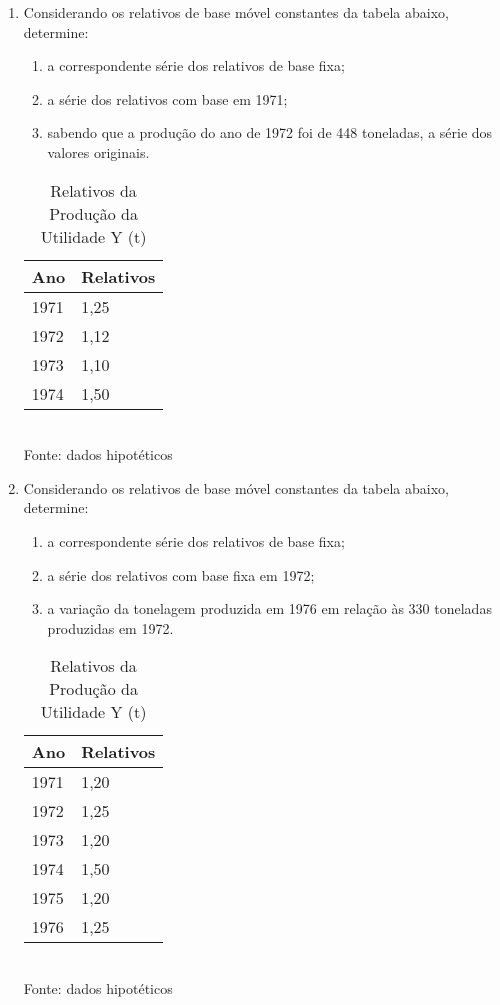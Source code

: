 \begin{enumerate}[resume]
\item Considerando os relativos de base móvel constantes da tabela abaixo, determine:
	\begin{enumerate}
	\item a correspondente série dos relativos de base fixa;
	\item a série dos relativos com base em 1971;
	\item sabendo que a produção do ano de 1972 foi de 448 toneladas, a série dos valores originais.
	\end{enumerate}
	\begin{table}[!htb]
	\centering
	\caption{Relativos da Produção da Utilidade Y (t)}
	\begin{tabular}{ll}
	Ano & Relativos \\
	\hline 
	1971 & 1,25 \\
	1972 & 1,12  \\
	1973 & 1,10  \\		
	1974 & 1,50  \\		
	\end{tabular} 
	\\ Fonte: dados hipotéticos
	\end{table}	
	
\item Considerando os relativos de base móvel constantes da tabela abaixo, determine:
	\begin{enumerate}
	\item a correspondente série dos relativos de base fixa;
	\item a série dos relativos com base fixa em 1972;
	\item a variação da tonelagem produzida em 1976 em relação às 330 toneladas produzidas em 1972.
	\end{enumerate}
	\begin{table}[!htb]
	\centering
	\caption{Relativos da Produção da Utilidade Y (t)}
	\begin{tabular}{ll}
	Ano & Relativos \\
	\hline 
	1971 & 1,20 \\
	1972 & 1,25  \\
	1973 & 1,20  \\		
	1974 & 1,50  \\		
	1975 & 1,20  \\	
	1976 & 1,25  \\		
	\end{tabular} 
	\\ Fonte: dados hipotéticos
	\end{table}		


\end{enumerate}
